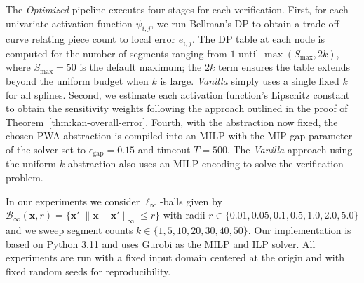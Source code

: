 The \textit{Optimized} pipeline executes four stages for each verification. First, for each univariate activation function $\psi_{i,j}$, we run Bellman's DP to obtain a trade-off curve relating piece count to local error $e_{i,j}$. The DP table at each node is computed for the number of segments ranging from $1$ until $\max(S_{\max}, 2k)$, where $S_{\max} = 50$ is the default maximum; the $2k$ term ensures the table extends beyond the uniform budget when $k$ is large. \textit{Vanilla} simply uses a single fixed $k$ for all splines. Second, we estimate each activation function's Lipschitz constant to obtain  the sensitivity weights following the approach outlined in the proof of Theorem~\ref{thm:kan-overall-error}.  Fourth, with the abstraction now fixed, the chosen PWA abstraction is compiled into an MILP with the  MIP gap parameter of the solver set to $\epsilon_{\text{gap}} = 0.15$ and timeout $T = 500$. The \textit{Vanilla} approach using the uniform-$k$ abstraction also uses an MILP encoding to solve the verification problem. 

In our experiments we consider $\ell_\infty$-balls given by $\mathcal{B}_\infty(\mathbf{x}, r) = \{\mathbf{x}' \mid \|\mathbf{x} - \mathbf{x}'\|_\infty \leq r\}$ with radii $r \in \{0.01, 0.05, 0.1, 0.5, 1.0, 2.0, 5.0\}$ and we sweep segment counts $k \in \{1, 5, 10, 20, 30, 40, 50\}$. Our implementation is based on Python 3.11 and uses Gurobi as the MILP and ILP solver. All experiments are run with a fixed input domain centered at the origin and with fixed random seeds for reproducibility. 

